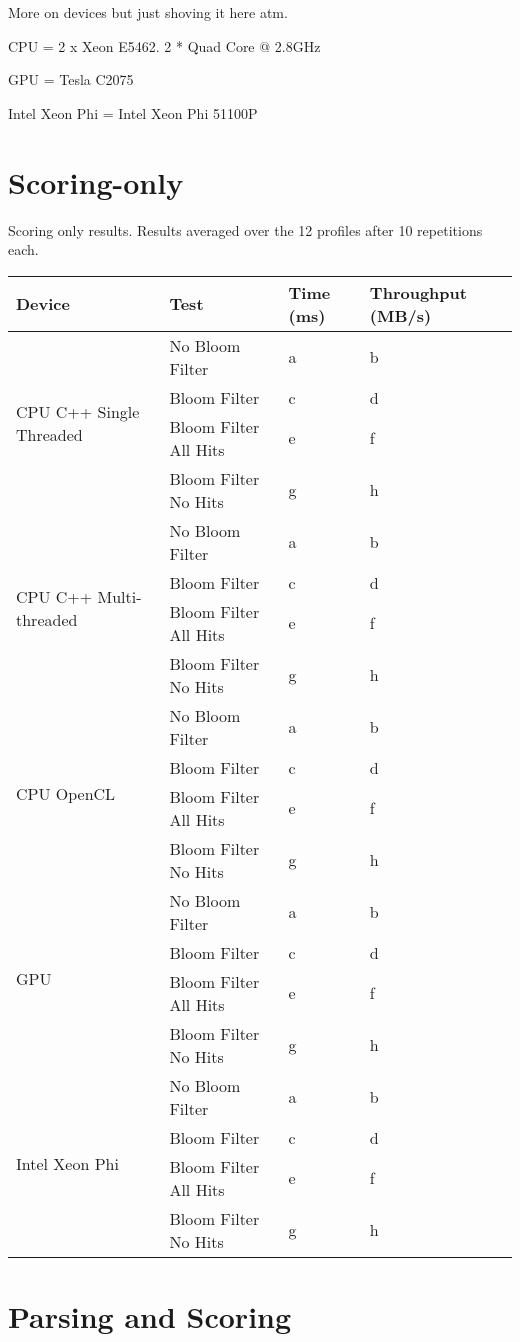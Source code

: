 More on devices but just shoving it here atm.

CPU = 2 x Xeon E5462. 2 * Quad Core @ 2.8GHz

GPU = Tesla C2075

Intel Xeon Phi = Intel Xeon Phi 51100P

\section{Scoring-only}

Scoring only results. Results averaged over the 12 profiles after 10 repetitions
each.

\begin{tabular}{|l|l|l|l|}
\hline
Device & Test & Time (ms) & Throughput (MB/s)\\
\hline
\multirow{4}{*}{CPU C++ Single Threaded}
& No Bloom Filter & a & b \\
& Bloom Filter & c & d \\
& Bloom Filter All Hits & e & f \\
& Bloom Filter No Hits & g & h \\
\hline
\multirow{4}{*}{CPU C++ Multi-threaded}
& No Bloom Filter & a & b \\
& Bloom Filter & c & d \\
& Bloom Filter All Hits & e & f \\
& Bloom Filter No Hits & g & h \\
\hline
\multirow{4}{*}{CPU OpenCL}
& No Bloom Filter & a & b \\
& Bloom Filter & c & d \\
& Bloom Filter All Hits & e & f \\
& Bloom Filter No Hits & g & h \\
\hline
\multirow{4}{*}{GPU}
& No Bloom Filter & a & b \\
& Bloom Filter & c & d \\
& Bloom Filter All Hits & e & f \\
& Bloom Filter No Hits & g & h \\
\hline
\multirow{4}{*}{Intel Xeon Phi}
& No Bloom Filter & a & b \\
& Bloom Filter & c & d \\
& Bloom Filter All Hits & e & f \\
& Bloom Filter No Hits & g & h \\
\hline
\end{tabular}

\section{Parsing and Scoring}

